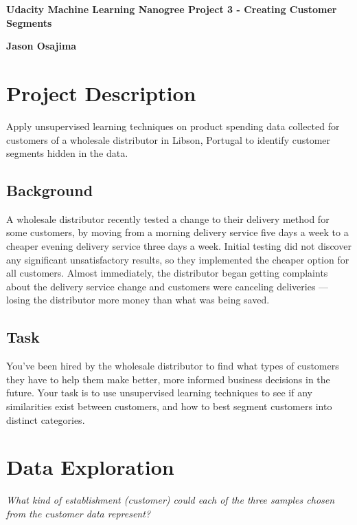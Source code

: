 \documentclass[11pt]{article}
\begin{document}
\begin{center}
    \Large
    \textbf{Udacity Machine Learning Nanogree Project 3 - Creating Customer Segments}
    
    \vspace{0.4cm}
    \large
    \textbf{Jason Osajima}
\end{center}



\section{Project Description}
\label{Summary}

Apply unsupervised learning techniques on product spending data collected for customers of a wholesale distributor in Libson, Portugal to identify customer segments hidden in the data.


\subsection{Background}

A wholesale distributor recently tested a change to their delivery method for some customers, by moving from a morning delivery service five days a week to a cheaper evening delivery service three days a week. Initial testing did not discover any significant unsatisfactory results, so they implemented the cheaper option for all customers. Almost immediately, the distributor began getting complaints about the delivery service change and customers were canceling deliveries — losing the distributor more money than what was being saved. 


\subsection{Task}

You’ve been hired by the wholesale distributor to find what types of customers they have to help them make better, more informed business decisions in the future. Your task is to use unsupervised learning techniques to see if any similarities exist between customers, and how to best segment customers into distinct categories.

\section{Data Exploration}

\textit{What kind of establishment (customer) could each of the three samples chosen from the customer data represent?}\\
\end{document}
